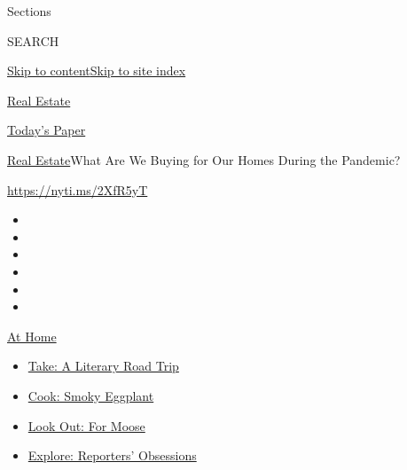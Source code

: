 Sections

SEARCH

\protect\hyperlink{site-content}{Skip to
content}\protect\hyperlink{site-index}{Skip to site index}

\href{https://www.nytimes.com/section/realestate}{Real Estate}

\href{https://myaccount.nytimes.com/auth/login?response_type=cookie\&client_id=vi}{}

\href{https://www.nytimes.com/section/todayspaper}{Today's Paper}

\href{/section/realestate}{Real Estate}\textbar{}What Are We Buying for
Our Homes During the Pandemic?

\url{https://nyti.ms/2XfR5yT}

\begin{itemize}
\item
\item
\item
\item
\item
\item
\end{itemize}

\href{https://www.nytimes.com/spotlight/at-home?action=click\&pgtype=Article\&state=default\&region=TOP_BANNER\&context=at_home_menu}{At
Home}

\begin{itemize}
\tightlist
\item
  \href{https://www.nytimes.com/2020/07/28/books/time-for-a-literary-road-trip.html?action=click\&pgtype=Article\&state=default\&region=TOP_BANNER\&context=at_home_menu}{Take:
  A Literary Road Trip}
\item
  \href{https://www.nytimes.com/2020/07/29/magazine/bored-with-your-home-cooking-some-smoky-eggplant-will-fix-that.html?action=click\&pgtype=Article\&state=default\&region=TOP_BANNER\&context=at_home_menu}{Cook:
  Smoky Eggplant}
\item
  \href{https://www.nytimes.com/2020/07/27/travel/moose-michigan-isle-royale.html?action=click\&pgtype=Article\&state=default\&region=TOP_BANNER\&context=at_home_menu}{Look
  Out: For Moose}
\item
  \href{https://www.nytimes.com/interactive/2020/at-home/even-more-reporters-editors-diaries-lists-recommendations.html?action=click\&pgtype=Article\&state=default\&region=TOP_BANNER\&context=at_home_menu}{Explore:
  Reporters' Obsessions}
\end{itemize}

